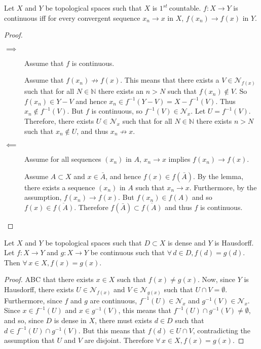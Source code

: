 \documentclass[letterpaper,12pt,fleqn]{article}
\renewcommand{\N}{\mathcal{N}}
\newcommand{\nat}{\mathbb{N}}
\newcommand{\f}{\(1^{st}\ \)}
\begin{document}
\begin{theorem}
  Let \(X\) and \(Y\) be topological spaces such that \(X\) is \f countable.  \(f:X\to Y\) is continuous iff
  for every convergent sequence \(x_n\to x\) in \(X\), \(f(x_n)\to f(x)\) in \(Y\).
\end{theorem}

\begin{proof}
  \begin{description}
  \item[]
  \item[\(\implies\)] Assume that \(f\) is continuous.

    Assume that \(f(x_n)\not\to f(x)\).  This means that there exists a \(V\in\N_{f(x)}\) such that for all
    \(N\in\nat\) there exists an \(n>N\) such that \(f(x_n)\notin V\).  So \(f(x_n)\in Y-V\) and hence \(x_n\in
    f^{-1}(Y-V)=X-f^{-1}(V)\).  Thus \(x_n\notin f^{-1}(V)\).  But \(f\) is continuous, so \(f^{-1}(V)\in\N_x\).
    Let \(U=f^{-1}(V)\).  Therefore, there exists \(U\in\N_x\) such that for all \(N\in\nat\) there exists \(n>N\)
    such that \(x_n\notin U\), and thus \(x_n\not\to x\).

  \item[\(\impliedby\)] Assume for all sequences \((x_n)\) in \(A\), \(x_n\to x\) implies \(f(x_n)\to f(x)\).

    Assume \(A\subset X\) and \(x\in\bar{A}\), and hence \(f(x)\in f(\bar{A})\).  By the lemma, there exists a
    sequence \((x_n)\) in \(A\) such that \(x_n\to x\).  Furthermore, by the assumption, \(f(x_n)\to f(x)\).  But
    \(f(x_n)\in f(A)\) and so \(f(x)\in\overline{f(A)}\).  Therefore \(f(\bar{A})\subset\overline{f(A)}\) and thus
    \(f\) is continuous.
  \end{description}
\end{proof}

\begin{theorem}
  Let \(X\) and \(Y\) be topological spaces such that \(D\subset X\) is dense and \(Y\) is Hausdorff.  Let
  \(f:X\to Y\) and \(g:X\to Y\) be continuous such that \(\forall\,d\in D,f(d)=g(d)\).  Then
  \(\forall\,x\in X, f(x)=g(x)\).
\end{theorem}

\begin{proof}
  ABC that there exists \(x\in X\) such that \(f(x)\ne g(x)\).  Now, since \(Y\) is Hausdorff, there exists
  \(U\in\N_{f(x)}\) and \(V\in\N_{g(x)}\) such that \(U\cap V=\emptyset\).  Furthermore, since \(f\) and \(g\) are
  continuous, \(f^{-1}(U)\in\N_x\) and \(g^{-1}(V)\in\N_x\).  Since \(x\in f^{-1}(U)\) and \(x\in g^{-1}(V)\), this
  means that \(f^{-1}(U)\cap g^{-1}(V)\ne\emptyset\), and so, since \(D\) is dense in \(X\), there must exists
  \(d\in D\) such that \(d\in f^{-1}(U)\cap g^{-1}(V)\).  But this means that \(f(d)\in U\cap V\), contradicting
  the assumption that \(U\) and \(V\) are disjoint.  Therefore \(\forall\,x\in X,f(x)=g(x)\).
\end{proof}
\end{document}
